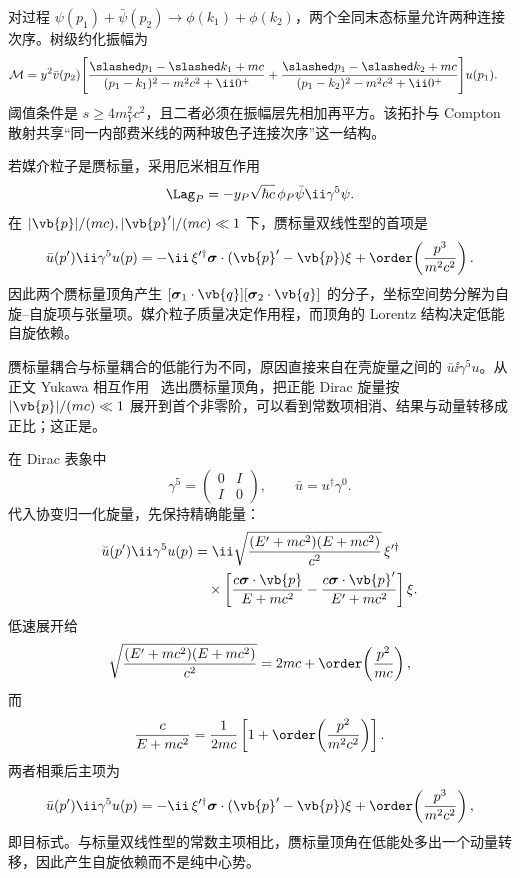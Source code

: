 对过程 $\psi(p_1)+\bar\psi(p_2)\to\phi(k_1)+\phi(k_2)$，两个全同末态标量允许两种连接次序。树级约化振幅为
\begin{align}
 \mathcal M
 =y^2\bar v(p_2)\Bigg[
 &\frac{\slashed p_1-\slashed k_1+mc}
 {(p_1-k_1)^2-m^2c^2+\ii0^+}
 +\frac{\slashed p_1-\slashed k_2+mc}
 {(p_1-k_2)^2-m^2c^2+\ii0^+}
 \Bigg]u(p_1).
 \label{eq:yukawa-annihilation-two-scalar-si-r10}
\end{align}
阈值条件是 $s\ge4m_Y^2c^2$，且二者必须在振幅层先相加再平方。该拓扑与 Compton 散射共享“同一内部费米线的两种玻色子连接次序”这一结构。


若媒介粒子是赝标量，采用厄米相互作用
\begin{equation}
 \Lag_P=-y_P\sqrt{\hbar c}\,\phi_P\bar\psi\ii\gamma^5\psi.
 \label{eq:pseudoscalar-yukawa-si-r10}
\end{equation}
在 $|\vb{p}|/(mc),|\vb{p}'|/(mc)\ll1$ 下，赝标量双线性型的首项是
\begin{equation}
 {
 \bar u(p')\ii\gamma^5u(p)
 =-\ii\,\xi'^\dagger
 \boldsymbol\sigma\cdot(\vb{p}'-\vb{p})\xi
 +\order\!\left(\frac{p^3}{m^2c^2}\right).}
 \label{eq:pseudoscalar-NR-bilinear-si-r10}
\end{equation}
因此两个赝标量顶角产生 $[\boldsymbol\sigma_1\cdot\vb{q}][\boldsymbol\sigma_2\cdot\vb{q}]$ 的分子，坐标空间势分解为自旋--自旋项与张量项。媒介粒子质量决定作用程，而顶角的 Lorentz 结构决定低能自旋依赖。


\medskip

赝标量耦合与标量耦合的低能行为不同，原因直接来自在壳旋量之间的 $\bar u\ii\gamma^5u$。从正文 Yukawa 相互作用~ 选出赝标量顶角，把正能 Dirac 旋量按 $|\vb{p}|/(mc)\ll1$ 展开到首个非零阶，可以看到常数项相消、结果与动量转移成正比；这正是。

在 Dirac 表象中
\begin{equation*}
 \gamma^5=
 \begin{pmatrix}0&I\\ I&0\end{pmatrix},
 \qquad
 \bar u=u^\dagger\gamma^0.
\end{equation*}
代入协变归一化旋量，先保持精确能量：
\begin{align*}
 \bar u(p')\ii\gamma^5u(p)
 &=\ii\sqrt{\frac{(E'+mc^2)(E+mc^2)}{c^2}}\,
 \xi'^\dagger\\
 &\quad\times\left[
 \frac{c\boldsymbol\sigma\cdot\vb{p}}{E+mc^2}
 -\frac{c\boldsymbol\sigma\cdot\vb{p}'}{E'+mc^2}
 \right]\xi.
\end{align*}
低速展开给
\begin{equation*}
 \sqrt{\frac{(E'+mc^2)(E+mc^2)}{c^2}}
 =2mc+\order\!\left(\frac{p^2}{mc}\right),
\end{equation*}
而
\begin{equation*}
 \frac{c}{E+mc^2}
 =\frac{1}{2mc}\left[1+\order\!\left(\frac{p^2}{m^2c^2}\right)\right].
\end{equation*}
两者相乘后主项为
\begin{equation*}
 \bar u(p')\ii\gamma^5u(p)
 =-\ii\,\xi'^\dagger\boldsymbol\sigma\cdot(\vb{p}'-\vb{p})\xi
 +\order\!\left(\frac{p^3}{m^2c^2}\right),
\end{equation*}
即目标式。与标量双线性型的常数主项相比，赝标量顶角在低能处多出一个动量转移，因此产生自旋依赖而不是纯中心势。
